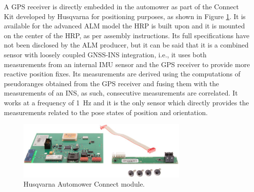A \gls{GPS} receiver is directly embedded in the automower as part of the Connect Kit developed by Husqvarna for positioning purposes, as shown in Figure \ref{fig:gps-module}.
It is available for the advanced \gls{ALM} model the \gls{HRP} is built upon and it is mounted on the center of the \gls{HRP}, as per assembly instructions.
Its full specifications have not been disclosed by the \gls{ALM} producer, but it can be said that it is a combined sensor with loosely coupled GNSS-INS integration, i.e., it uses both measurements from an internal \gls{IMU} sensor and the \gls{GPS} receiver to provide more reactive position fixes. 
Its measurements are derived using the computations of pseudoranges obtained from the \gls{GPS} receiver and fusing them with the measurements of an \gls{INS}, as such, consecutive measurements are correlated.
It works at a frequency of \SI{1}{Hz} and it is the only sensor which directly provides the measurements related to the pose states of position and orientation.
\begin{figure}[!ht]
	\begin{center}
			\begin{center}
				\includegraphics[width=0.75\textwidth]{Images/3-0-SetUp/Husqvarna_Automower_Connect_module_2.jpeg}
			\end{center}
			\caption{Husqvarna Automower Connect module.}
			\label{fig:gps-module}
	\end{center}
\end{figure}


